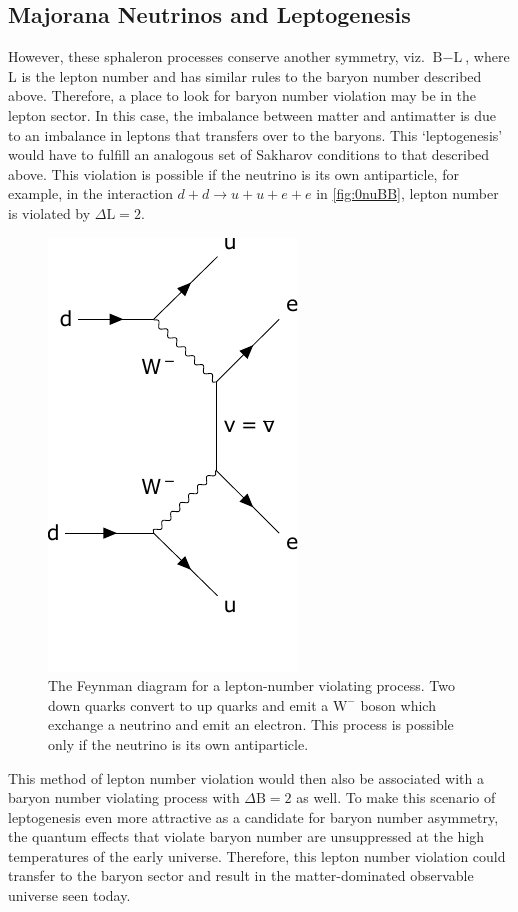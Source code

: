 \subsection{Majorana Neutrinos and Leptogenesis}
However, these sphaleron processes conserve another symmetry, viz. $\textrm{B}-\textrm{L}$, where L is the lepton number and has similar rules to the baryon number described above.
Therefore, a place to look for baryon number violation may be in the lepton sector.
In this case, the imbalance between matter and antimatter is due to an imbalance in leptons that transfers over to the baryons.
This `leptogenesis' would have to fulfill an analogous set of Sakharov conditions to that described above.
This violation is possible if the neutrino is its own antiparticle, for example, in the interaction $d + d \rightarrow u + u + e + e$ in \autoref{fig:0nuBB}, lepton number is violated by $\Delta\textrm{L}=2$.
\begin{figure}[tbph]
\centering
\includegraphics[width=0.35\linewidth]{Figures/0NuBB_clip.pdf}
\caption[The Feynman diagram for a lepton-number violating process.]
{The Feynman diagram for a lepton-number violating process.
Two down quarks convert to up quarks and emit a $\textrm{W}^{-}$ boson which exchange a neutrino and emit an electron.
This process is possible only if the neutrino is its own antiparticle.}
\label{fig:0nuBB}
\end{figure}
This method of lepton number violation would then also be associated with a baryon number violating process with $\Delta\textrm{B}=2$ as well.
To make this scenario of leptogenesis even more attractive as a candidate for baryon number asymmetry, the quantum effects that violate baryon number are unsuppressed at the high temperatures of the early universe.
Therefore, this lepton number violation could transfer to the baryon sector and result in the matter-dominated observable universe seen today.